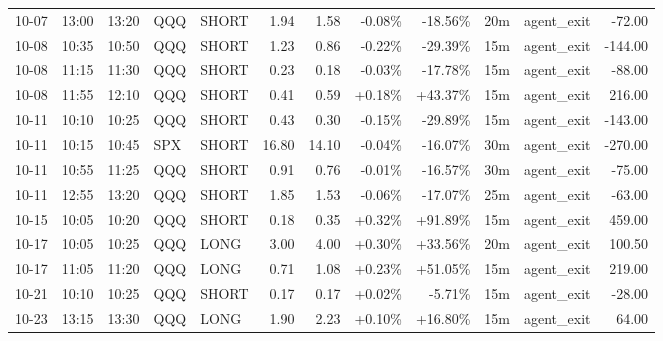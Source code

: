 \documentclass[11pt,a4paper]{article}
\begin{document}
\begin{center}
\begin{longtable}{>{\color{txtmain}}l l l l l r r r r r >{\color{txtmain}}l r}
10-07 & 13:00 & 13:20 & QQQ & SHORT & 1.94 & 1.58 & \textcolor{lossred}{-0.08\%} & \textcolor{lossred}{-18.56\%} & 20m & agent\_exit & \textcolor{lossred}{-72.00} \\
10-08 & 10:35 & 10:50 & QQQ & SHORT & 1.23 & 0.86 & \textcolor{lossred}{-0.22\%} & \textcolor{lossred}{-29.39\%} & 15m & agent\_exit & \textcolor{lossred}{-144.00} \\
10-08 & 11:15 & 11:30 & QQQ & SHORT & 0.23 & 0.18 & \textcolor{lossred}{-0.03\%} & \textcolor{lossred}{-17.78\%} & 15m & agent\_exit & \textcolor{lossred}{-88.00} \\
10-08 & 11:55 & 12:10 & QQQ & SHORT & 0.41 & 0.59 & \textcolor{wingreen}{+0.18\%} & \textcolor{wingreen}{+43.37\%} & 15m & agent\_exit & \textcolor{wingreen}{216.00} \\
10-11 & 10:10 & 10:25 & QQQ & SHORT & 0.43 & 0.30 & \textcolor{lossred}{-0.15\%} & \textcolor{lossred}{-29.89\%} & 15m & agent\_exit & \textcolor{lossred}{-143.00} \\
10-11 & 10:15 & 10:45 & SPX & SHORT & 16.80 & 14.10 & \textcolor{lossred}{-0.04\%} & \textcolor{lossred}{-16.07\%} & 30m & agent\_exit & \textcolor{lossred}{-270.00} \\
10-11 & 10:55 & 11:25 & QQQ & SHORT & 0.91 & 0.76 & \textcolor{lossred}{-0.01\%} & \textcolor{lossred}{-16.57\%} & 30m & agent\_exit & \textcolor{lossred}{-75.00} \\
10-11 & 12:55 & 13:20 & QQQ & SHORT & 1.85 & 1.53 & \textcolor{lossred}{-0.06\%} & \textcolor{lossred}{-17.07\%} & 25m & agent\_exit & \textcolor{lossred}{-63.00} \\
10-15 & 10:05 & 10:20 & QQQ & SHORT & 0.18 & 0.35 & \textcolor{wingreen}{+0.32\%} & \textcolor{wingreen}{+91.89\%} & 15m & agent\_exit & \textcolor{wingreen}{459.00} \\
10-17 & 10:05 & 10:25 & QQQ & LONG & 3.00 & 4.00 & \textcolor{wingreen}{+0.30\%} & \textcolor{wingreen}{+33.56\%} & 20m & agent\_exit & \textcolor{wingreen}{100.50} \\
10-17 & 11:05 & 11:20 & QQQ & LONG & 0.71 & 1.08 & \textcolor{wingreen}{+0.23\%} & \textcolor{wingreen}{+51.05\%} & 15m & agent\_exit & \textcolor{wingreen}{219.00} \\
10-21 & 10:10 & 10:25 & QQQ & SHORT & 0.17 & 0.17 & \textcolor{wingreen}{+0.02\%} & \textcolor{lossred}{-5.71\%} & 15m & agent\_exit & \textcolor{lossred}{-28.00} \\
10-23 & 13:15 & 13:30 & QQQ & LONG & 1.90 & 2.23 & \textcolor{wingreen}{+0.10\%} & \textcolor{wingreen}{+16.80\%} & 15m & agent\_exit & \textcolor{wingreen}{64.00} \\

\end{longtable}
\end{center}
\end{document}
